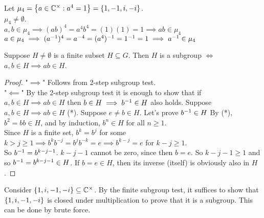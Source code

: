 \begin{example}
    Let $\mu_4 = \left\{a \in \mathbb{C}^\times: a^4 = 1\right\} = \left\{1, -1, i, -i\right\}$. \\
    $\mu_4 \neq \emptyset$. \\
    $a,b \in \mu_4 \implies (ab)^4 = a^4 b^4 = (1)(1) = 1 \implies ab \in \mu_4$ \\
    $a \in \mu_4 \implies (a^{-1})^4 = a^{-4} = (a^4)^{-1} = 1^{-1} = 1 \implies a^{-1} \in \mu_4$
\end{example}

\begin{theorem}
    Suppose $H \neq \emptyset$ is a finite subset $H \subseteq G$. Then $H$ is a subgroup $\iff$ $a,b \in H \implies ab \in H$.
\end{theorem}
\begin{proof}
    "$\implies$" Follows from 2-step subgroup test. \\
    "$\impliedby$" By the 2-step subgroup test it is enough to show that if $a,b \in H \implies ab \in H$ then $b \in H \implies b^{-1} \in H$ also holds.
    Suppose $a,b \in H \implies ab \in H$ (*). Suppose $e \neq b \in H$. Let's prove $b^{-1} \in H$ By (*), $b^2 = bb \in H$, and by induction, $b^n \in H$ for all $n \geq 1$. \\
    Since $H$ is a finite set, $b^k = b^j$ for some $k > j \geq 1 \implies b^kb^{-j} = b^jb^{-k} = e \implies b^{k-j} = e$ for $k-j \geq 1$. \\
    So $b^{-1} = b^{k - j - 1}$. $k - j - 1$ cannot be zero, since then $b = e$. So $k - j - 1 \geq 1$  and so $b^{-1} = b^{k-j-1} \in H$.
    If $b = e \in H$, then its inverse (itself) is obviously also in $H$.
\end{proof}

\begin{example}
    Consider $\left\{1, i, -1, -i\right\} \subseteq \mathbb{C}^\times$. By the finite subgroup test, it suffices to show that $\left\{1, i, -1, -i\right\}$ is closed under multiplication to prove that it is a subgroup. This can be done by brute force.
\end{example}